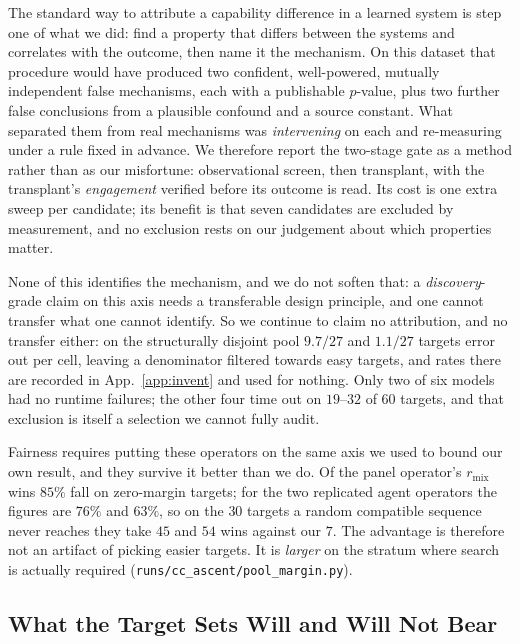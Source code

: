 \documentclass[11pt]{article}
\begin{document}
The standard way to attribute a capability difference in a learned system is step one of what we did: find a
property that differs between the systems and correlates with the outcome, then name it the mechanism. On this
dataset that procedure would have produced two confident, well-powered, mutually independent false mechanisms,
each with a publishable $p$-value, plus two further false conclusions from a plausible confound and a source
constant. What separated them from real mechanisms was \emph{intervening} on each and re-measuring under a rule
fixed in advance. We therefore report the two-stage gate as a method rather than as our misfortune:
observational screen, then transplant, with the transplant's \emph{engagement} verified before its outcome is
read. Its cost is one extra sweep per candidate; its benefit is that seven candidates are excluded by
measurement, and no exclusion rests on our judgement about which properties matter.

None of this identifies the mechanism, and we do not soften that: a \emph{discovery}-grade claim on this axis
needs a transferable design principle, and one cannot transfer what one cannot identify. So we continue to
claim no attribution, and no transfer either: on the structurally
disjoint pool $9.7/27$ and $1.1/27$ targets error out per cell, leaving a denominator filtered towards easy
targets, and rates there are recorded in App.~\ref{app:invent} and used for nothing. Only two of six models
had no runtime failures; the other four time out on $19$--$32$ of $60$ targets, and that exclusion is itself a
selection we cannot fully audit.

Fairness requires putting these operators on the same axis we used to bound our own result, and they survive it
better than we do. Of the panel operator's $r_{\mathrm{mix}}$ wins $85\%$ fall on zero-margin targets; for the
two replicated agent operators the figures are $76\%$ and $63\%$, so on the $30$ targets a random compatible
sequence never reaches they take $45$ and $54$ wins against our $7$. The advantage is therefore not an artifact
of picking easier targets. It is \emph{larger} on the stratum where search is actually required
(\texttt{runs/cc\_ascent/pool\_margin.py}).

\subsection{What the Target Sets Will and Will Not Bear}\label{sec:exp:pools}
\end{document}
